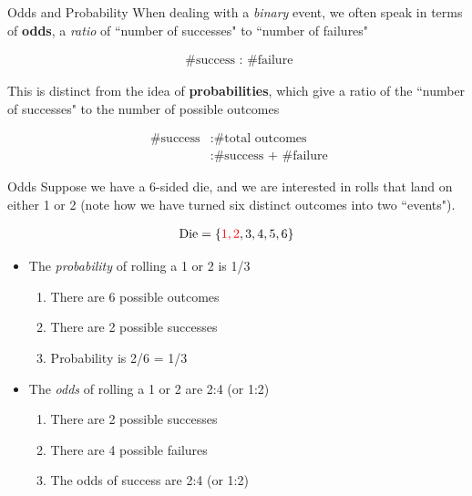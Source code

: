 \documentclass{beamer}
\begin{document}
\begin{frame}{Odds and Probability}
When dealing with a \textit{binary} event, we often speak in terms of \textbf{odds}, a \textit{ratio} of ``number of successes" to ``number of failures"  \vspace{4mm}

\begin{align*}
\text{ \# success : \# failure}
\end{align*}

This is distinct from the idea of \textbf{probabilities}, which give a ratio of the ``number of successes" to the number of possible outcomes

\begin{align*}
\text{ \# success} &: \text{\# total outcomes} \\
&: \text{\# success + \# failure}
\end{align*}

\end{frame}


\begin{frame}{Odds}
Suppose we have a 6-sided die, and we are interested in rolls that land on either 1 or 2 (note how we have turned six distinct outcomes into two ``events").

\begin{align*}
\text{Die} = \{ \color{red} 1, 2 \color{black}, 3, 4, 5, 6 \}
\end{align*}

\begin{itemize}
\item The \textit{probability} of rolling a 1 or 2 is 1/3
\begin{enumerate}
\item There are 6 possible outcomes
\item There are 2 possible successes
\item Probability is 2/6 = 1/3
\end{enumerate} \vspace{2mm}
\item The \textit{odds} of rolling a 1 or 2 are 2:4 (or 1:2)
\begin{enumerate}
\item There are 2 possible successes
\item There are 4 possible failures
\item The odds of success are 2:4 (or 1:2)
\end{enumerate}
\end{itemize}

\end{frame}
\end{document}

